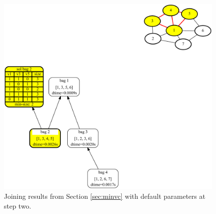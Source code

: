 \documentclass[a4paper, 12pt, bibliography=totoc]{scrartcl}
\begin{document}
\begin{figure}[H]
	\centering
	\includegraphics[width=\linewidth,height=0.6\textheight,keepaspectratio]{images/SVGJOIN/default2.pdf}
	\caption{Joining results from Section \ref{sec:minvc} with default parameters at step two.}
	\label{fig:joindefault}
\end{figure}
\end{document}
